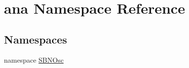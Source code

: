 \hypertarget{namespaceana}{
\section{ana Namespace Reference}
\label{namespaceana}
}
\subsection*{Namespaces}
\begin{DoxyCompactItemize}
\item 
namespace \hyperlink{namespaceana_1_1SBNOsc}{SBNOsc}
\end{DoxyCompactItemize}
